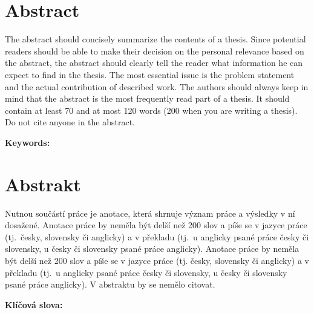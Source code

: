 \section*{Abstract}

The abstract should concisely summarize the
contents of a thesis. Since potential readers should be able to
make their decision on the personal relevance based on the abstract,
the abstract should clearly tell the reader what information
he can expect to find in the thesis. The most essential issue
is the problem statement and the actual contribution of described
work. The authors should always keep in mind that the
abstract is the most frequently read part of a thesis. It should
contain at least 70 and at most 120 words (200 when you are writing a thesis).
Do not cite anyone in the abstract.

\bigskip

\textbf{Keywords:} \Keywords


\bigskip

\section*{Abstrakt}\label{abstract}

Nutnou sou\v{c}\'{a}st\'{i} pr\'{a}ce je anotace, kter\'{a} shrnuje v\'{y}znam pr\'{a}ce a v\'{y}sledky v n\'{i} dosa\v{z}en\'{e}. Anotace pr\'{a}ce by nem\v{e}la b\'{y}t del\v{s}\'{i} ne\v{z} 200 slov a p\'{i}\v{s}e se v jazyce pr\'{a}ce (tj.\ \v{c}esky, slovensky \v{c}i anglicky) a v p\v{r}ekladu (tj.\ u anglicky psan\'{e} pr\'{a}ce \v{c}esky \v{c}i slovensky, u \v{c}esky \v{c}i slovensky psan\'{e} pr\'{a}ce anglicky). Anotace pr\'{a}ce by nem\v{e}la b\'{y}t del\v{s}\'{i} ne\v{z} 200 slov a p\'{i}\v{s}e se v jazyce pr\'{a}ce (tj. \v{c}esky, slovensky \v{c}i anglicky) a v p\v{r}ekladu (tj.\ u anglicky psan\'{e} pr\'{a}ce \v{c}esky \v{c}i slovensky, u \v{c}esky \v{c}i slovensky psan\'{e} pr\'{a}ce anglicky). V abstraktu by se nem\v{e}lo citovat.

\bigskip

\textbf{Kl\'{i}\v{c}ov\'{a} slova:} \Klic

